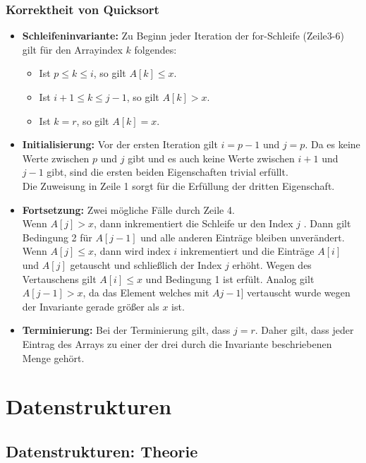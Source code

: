 		
		\subsubsection{Korrektheit von Quicksort}
			\begin{itemize}
				\item \textbf{Schleifeninvariante:} Zu Beginn jeder Iteration der for-Schleife (Zeile3-6)
					gilt für den Arrayindex $k$ folgendes:
				\begin{itemize}
					\item Ist $p \leq k \leq i$, so gilt $A[k] \leq x$.
					\item Ist $i + 1 \leq k \leq j - 1$, so gilt $A[k] > x$.
					\item Ist $k = r $, so gilt $A[k] = x$.
				\end{itemize}
				\item \textbf{Initialisierung:} Vor der ersten Iteration gilt $i = p-1$ und $j = p$.
					Da es keine Werte zwischen $p$ und $j$ gibt und es auch keine Werte zwischen $i+1$ 
					und $j-1$ gibt, sind die ersten beiden Eigenschaften trivial erfüllt. \\
					Die Zuweisung in Zeile 1 sorgt für die Erfüllung der dritten Eigenschaft.
				\item \textbf{Fortsetzung:} Zwei mögliche Fälle durch Zeile 4. \\
					Wenn $A[j] > x$, dann inkrementiert die Schleife ur den Index $j$ . Dann gilt Bedingung 2
					für $A[j-1]$ und alle anderen Einträge bleiben unverändert. \\
					Wenn $A[j] \leq x$, dann wird index $i$ inkrementiert und die Einträge $A[i]$ und $A[j]$
					getauscht und schlie\ss lich der Index $j$ erhöht. Wegen des Vertauschens gilt 
					$A[i] \leq x$ und Bedingung 1 ist erfült. Analog gilt $A[j-1] > x$, da das Element welches
					mit $Aj-1]$ vertauscht wurde wegen der Invariante gerade grö\ss er als $x$ ist.
				\item \textbf{Terminierung:} Bei der Terminierung gilt, dass $j=r$. Daher gilt, dass
					jeder Eintrag des Arrays zu einer der drei durch die Invariante beschriebenen Menge gehört.
				\end{itemize}
				\vspace{1.5cm}


\newpage
\section{Datenstrukturen}
	\subsection{Datenstrukturen: Theorie}
